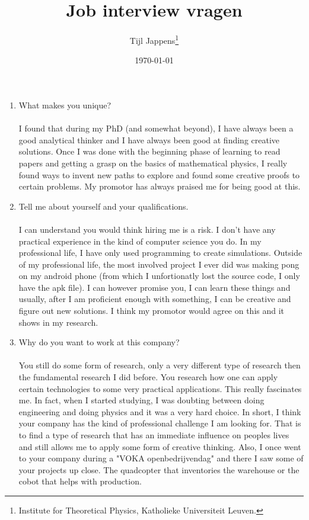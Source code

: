 \documentclass[12pt,a4paper,twoside]{article}
\title{Job interview vragen}
\author{Tijl Jappens\footnote{Institute for Theoretical Physics, Katholieke Universiteit Leuven.}}
\date{\today}
\begin{document}
	\maketitle 
	\begin{enumerate}
		\item What makes you unique?\\\\
		I found that during my PhD (and somewhat beyond), I have always been a good analytical thinker and I have always been good at finding creative solutions. Once I was done with the beginning phase of learning to read papers and getting a grasp on the basics of mathematical physics, I really found ways to invent new paths to explore and found some creative proofs to certain problems. My promotor has always praised me for being good at this.
		\item Tell me about yourself and your qualifications.\\\\
		I can understand you would think hiring me is a risk. I don't have any practical experience in the kind of computer science you do. In my professional life, I have only used programming to create simulations. Outside of my professional life, the most involved project I ever did was making pong on my android phone (from which I unfortionatly lost the source code, I only have the apk file). I can however promise you, I can learn these things and usually, after I am proficient enough with something, I can be creative and figure out new solutions. I think my promotor would agree on this and it shows in my research.
		\item Why do you want to work at this company?\\\\
		You still do some form of research, only a very different type of research then the fundamental research I did before. You research how one can apply certain technologies to some very practical applications. This really fascinates me. In fact, when I started studying, I was doubting between doing engineering and doing physics and it was a very hard choice. In short, I think your company has the kind of professional challenge I am looking for. That is to find a type of research that has an immediate influence on peoples lives and still allows me to apply some form of creative thinking. Also, I once went to your company during a "VOKA openbedrijvendag" and there I saw some of your projects up close. The quadcopter that inventories the warehouse or the cobot that helps with production.

\end{enumerate}
\end{document}

